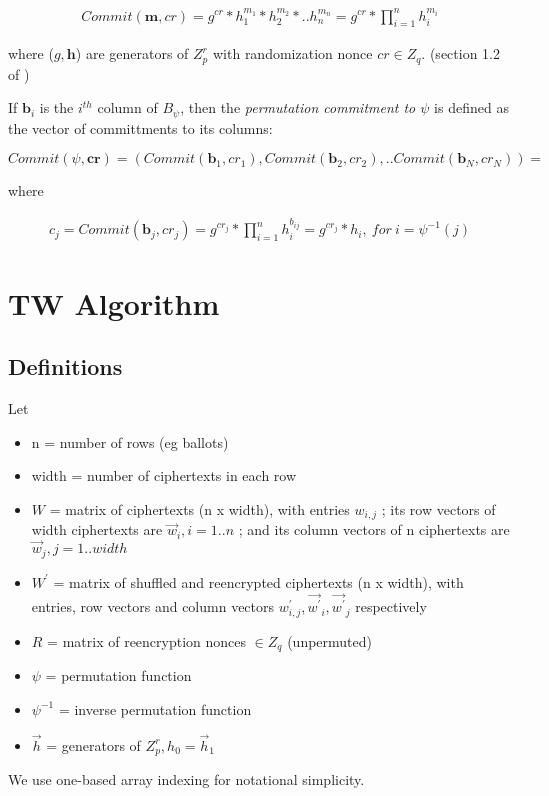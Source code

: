 \documentclass{article}
\begin{document}
\begin{align*}
Commit(\textbf{m},cr)=g^{cr}*h_{1}^{m_{1}}*h_{2}^{m_{2}}*..h_{n}^{m_{n}}=g^{cr}*\prod_{i=1}^{n}h_{i}^{m_{i}}
\end{align*}

where ($g,\textbf{h}$) are generators of $Z_{p}^{r}$ with randomization
nonce $cr\in Z_{q}$. (section 1.2 of )

If $\textbf{b}_{i}$ is the $i^{th}$ column of $B_{\psi}$, then
the \emph{permutation commitment to $\psi$} is defined as the vector
of committments to its columns:

\[
Commit(\psi,\textbf{cr})=(Commit(\textbf{b}_{1},cr_{1}),Commit(\textbf{b}_{2},cr_{2}),..Commit(\textbf{b}_{N},cr_{N}))=
\]

where

\begin{align*}
c_{j}=Commit(\textbf{b}_{j},cr_{j})=g^{cr_{j}}*\prod_{i=1}^{n}h_{i}^{b_{ij}}=g^{cr_{j}}*h_{i},\ for\ i=\psi^{-1}(j)
\end{align*}

\section{TW Algorithm}

\subsection{Definitions}

Let
\begin{itemize}
\item n = number of rows (eg ballots) 
\item width = number of ciphertexts in each row 
\item $W$ = matrix of ciphertexts (n x width), with entries $w_{i,j}$
; its row vectors of width ciphertexts are $\vec{w}_{i},i=1..n$ ;
and its column vectors of n ciphertexts are $\vec{w}_{j},j=1..width$ 
\item $W^{\prime}$ = matrix of shuffled and reencrypted ciphertexts (n
x width), with entries, row vectors and column vectors $w_{i,j}^{\prime},\vec{w^{\prime}}_{i},\vec{w^{\prime}}_{j}$
respectively 
\item $R$ = matrix of reencryption nonces $\in Z_{q}$ (unpermuted) 
\item $\psi$ = permutation function 
\item $\psi^{-1}$ = inverse permutation function 
\item $\vec{h}$ = generators of $Z_{p}^{r},h_{0}=\vec{h}_{1}$ 
\end{itemize}
We use one-based array indexing for notational simplicity.
\end{document}
